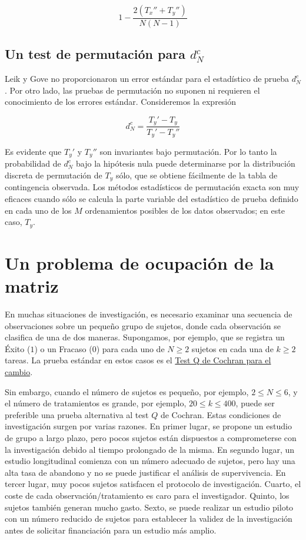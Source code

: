 \documentclass[12pt,a4paper,]{book}
\numberwithin{dummy}{section}
\theoremstyle{ocrenumbox}
\theoremstyle{blacknumex}
\theoremstyle{blacknumbox}
\theoremstyle{ocrenum}
\theoremstyle{ocrenum}
\begin{document}
\[
1-\frac{2(T_x''+T_y'')}{N(N-1)}
\]

\hypertarget{un-test-de-permutaciuxf3n-para-d_nc}{%
\subsection{\texorpdfstring{Un test de permutación para
\(d_N^c\)}{Un test de permutación para d\_N\^{}c}}\label{un-test-de-permutaciuxf3n-para-d_nc}}

Leik y Gove no proporcionaron un error estándar para el estadístico de
prueba \(d_ N^c\) \citep{Leik1969}. Por otro lado, las pruebas de
permutación no suponen ni requieren el conocimiento de los errores
estándar. Consideremos la expresión

\[
d_N^c=\frac{T_y'-T_y}{T_y'-T_y''}
\]

Es evidente que \(T_y'\) y \(T_y''\) son invariantes bajo permutación.
Por lo tanto la probabilidad de \(d_N^c\) bajo la hipótesis nula puede
determinarse por la distribución discreta de permutación de \(T_y\)
sólo, que se obtiene fácilmente de la tabla de contingencia observada.
Los métodos estadísticos de permutación exacta son muy eficaces cuando
sólo se calcula la parte variable del estadístico de prueba definido en
cada uno de los \(M\) ordenamientos posibles de los datos observados; en
este caso, \(T_y\).

\hypertarget{un-problema-de-ocupaciuxf3n-de-la-matriz}{%
\section{Un problema de ocupación de la
matriz}\label{un-problema-de-ocupaciuxf3n-de-la-matriz}}

En muchas situaciones de investigación, es necesario examinar una
secuencia de observaciones sobre un pequeño grupo de sujetos, donde cada
observación se clasifica de una de dos maneras. Supongamos, por ejemplo,
que se registra un Éxito (\(1\)) o un Fracaso (\(0\)) para cada uno de
\(N \ge 2\) sujetos en cada una de \(k \ge 2\) tareas. La prueba
estándar en estos casos es el
\protect\hyperlink{test-q-de-cochran-para-el-cambio}{Test Q de Cochran
para el cambio}.

Sin embargo, cuando el número de sujetos es pequeño, por ejemplo,
\(2 \le N \le 6\), y el número de tratamientos es grande, por ejemplo,
\(20 \le k \le 400\), puede ser preferible una prueba alternativa al
test \(Q\) de Cochran. Estas condiciones de investigación surgen por
varias razones. En primer lugar, se propone un estudio de grupo a largo
plazo, pero pocos sujetos están dispuestos a comprometerse con la
investigación debido al tiempo prolongado de la misma. En segundo lugar,
un estudio longitudinal comienza con un número adecuado de sujetos, pero
hay una alta tasa de abandono y no se puede justificar el análisis de
supervivencia. En tercer lugar, muy pocos sujetos satisfacen el
protocolo de investigación. Cuarto, el coste de cada
observación/tratamiento es caro para el investigador. Quinto, los
sujetos también generan mucho gasto. Sexto, se puede realizar un estudio
piloto con un número reducido de sujetos para establecer la validez de
la investigación antes de solicitar financiación para un estudio más
amplio.
\end{document}
